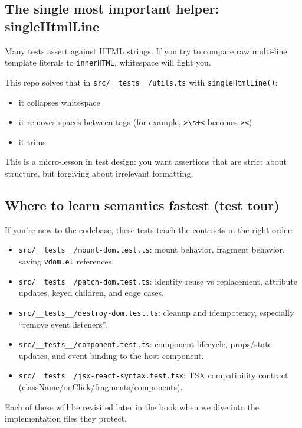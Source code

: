 \subsection{The single most important helper: singleHtmlLine}
Many tests assert against HTML strings.
If you try to compare raw multi-line template literals to \texttt{innerHTML}, whitespace will fight you.

This repo solves that in \texttt{src/\_\_tests\_\_/utils.ts} with \texttt{singleHtmlLine()}:

\begin{itemize}
  \item it collapses whitespace
  \item it removes spaces between tags (for example, \texttt{>\textbackslash s+<} becomes \texttt{><})
  \item it trims
\end{itemize}

This is a micro-lesson in test design: you want assertions that are strict about structure, but forgiving about irrelevant formatting.

\subsection{Where to learn semantics fastest (test tour)}
If you're new to the codebase, these tests teach the contracts in the right order:

\begin{itemize}
  \item \texttt{src/\_\_tests\_\_/mount-dom.test.ts}:
    mount behavior, fragment behavior, saving \texttt{vdom.el} references.
  \item \texttt{src/\_\_tests\_\_/patch-dom.test.ts}:
    identity reuse vs replacement, attribute updates, keyed children, and edge cases.
  \item \texttt{src/\_\_tests\_\_/destroy-dom.test.ts}:
    cleanup and idempotency, especially ``remove event listeners''.
  \item \texttt{src/\_\_tests\_\_/component.test.ts}:
    component lifecycle, props/state updates, and event binding to the host component.
  \item \texttt{src/\_\_tests\_\_/jsx-react-syntax.test.tsx}:
    TSX compatibility contract (className/onClick/fragments/components).
\end{itemize}

Each of these will be revisited later in the book when we dive into the implementation files they protect.

